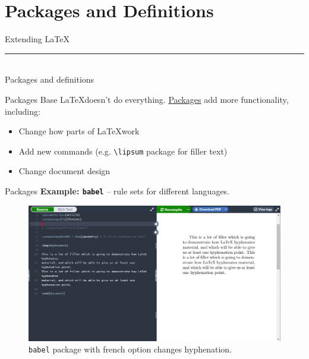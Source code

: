 \documentclass{beamer}
\begin{document}
{  \section{Packages and Definitions}

  \begin{frame}[plain]
    \vfill
    \centering
    \begin{beamercolorbox}[sep=8pt,center,shadow=true,rounded=true]{Extending LaTeX}
      \insertsectionhead\par%
      \color{davisblue}\noindent\rule{10cm}{1pt} \\
      \footnotesize{Packages and definitions}
    \end{beamercolorbox}
    \vfill
  \end{frame}

  \begin{frame}{Packages}
    Base \LaTeX doesn't do everything. \underline{Packages} add more functionality, including:
    \begin{itemize}
      \item Change how parts of \LaTeX work
      \item Add new commands (e.g. \texttt{\textbackslash lipsum} package for filler text)
      \item Change document design
    \end{itemize}
  \end{frame}

  \begin{frame}{Packages}
    \textbf{Example: \texttt{babel}} -- rule sets for different languages.%
    \begin{figure}
      \includegraphics[width=0.9\linewidth]{day01-overleaf-08A-package-geom.png}
      \caption{\texttt{babel} package with french option changes hyphenation.}
      \label{fig:day01-overleaf-08A}
    \end{figure}
  \end{frame}

}
\end{document}
